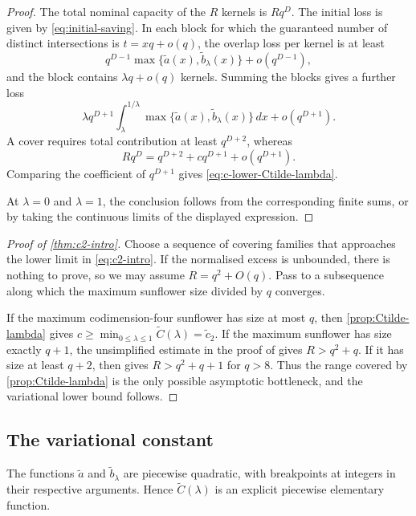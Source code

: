 \documentclass[11pt,reqno]{amsart}
\numberwithin{equation}{section}
\theoremstyle{definition}
\theoremstyle{remark}
\newcommand{\cC}{\mathcal C}
\newcommand{\set}[1]{\{#1\}}
\def\mathcal#1{#1}%
\begin{document}
\begin{proof}
The total nominal capacity of the $R$ kernels is $Rq^D$.  The initial loss is given by \eqref{eq:initial-saving}.  In each block for which the guaranteed number of distinct intersections is
$t=xq+o(q)$, the overlap loss per kernel is at least
\[
 q^{D-1}
 \max\set{\widetilde a(x),\widetilde b_\lambda(x)}
 +o(q^{D-1}),
\]
and the block contains $\lambda q+o(q)$ kernels.  Summing the blocks gives a further loss
\[
 \lambda q^{D+1}
 \int_\lambda^{1/\lambda}
 \max\set{\widetilde a(x),\widetilde b_\lambda(x)}\,dx
 +o(q^{D+1}).
\]
A cover requires total contribution at least $q^{D+2}$, whereas
\[
 Rq^D=q^{D+2}+cq^{D+1}+o(q^{D+1}).
\]
Comparing the coefficient of $q^{D+1}$ gives
\eqref{eq:c-lower-Ctilde-lambda}.

At $\lambda=0$ and $\lambda=1$, the conclusion follows from the corresponding finite sums, or by taking the continuous limits of the displayed expression.
\end{proof}

\begin{proof}[Proof of \cref{thm:c2-intro}]
Choose a sequence of covering families that approaches the lower limit in
\eqref{eq:c2-intro}.  If the normalised excess is unbounded, there is nothing to prove, so we may assume
$R=q^2+O(q)$.  Pass to a subsequence along which the maximum sunflower size divided by $q$ converges.

If the maximum codimension-four sunflower has size at most $q$, then
\cref{prop:Ctilde-lambda} gives
$c\ge\min_{0\le\lambda\le1}\widetilde{\cC}(\lambda)=\widetilde c_2$.  If the maximum sunflower has size exactly $q+1$, the unsimplified estimate in the proof of
\cite[Proposition~4.6]{ChowRimanic} gives
$R>q^2+q$.  If it has size at least $q+2$, then
\cite[Proposition~A.1]{ChowRimanic} gives
$R>q^2+q+1$ for $q>8$.  Thus the range covered by
\cref{prop:Ctilde-lambda} is the only possible asymptotic bottleneck, and the variational lower bound follows.
\end{proof}

\subsection{The variational constant}

The functions $\widetilde a$ and $\widetilde b_\lambda$ are piecewise quadratic, with breakpoints at integers in their respective arguments.  Hence
$\widetilde{\cC}(\lambda)$ is an explicit piecewise elementary function.
\end{document}
